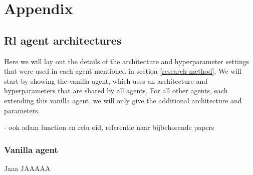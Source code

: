 \chapter{Appendix}\label{appendix}
\section{Rl agent architectures}\label{appendix-agents}
Here we will lay out the details of the architecture and hyperparameter settings that were used in each agent mentioned in section \ref{research-method}. We will start by showing the vanilla agent, which uses an architecture and hyperparameters that are shared by all agents. For all other agents, each extending this vanilla agent, we will only give the additional architecture and parameters.

- ook adam function en relu oid, referentie naar bijbehorende papers

\subsection{Vanilla agent}
Jaaa JAAAAA
